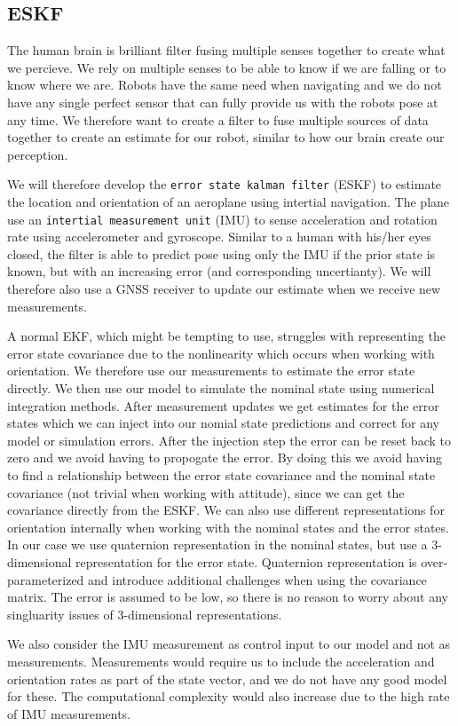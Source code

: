 \subsection{ESKF}
The human brain is brilliant filter fusing multiple senses together to create what we percieve. We rely on multiple senses to be able to know if we are falling or to know where we are. 
Robots have the same need when navigating and we do not have any single perfect sensor that can fully provide us with the robots pose at any time. We therefore want to create a filter to fuse multiple sources of data together to create an estimate for our robot, similar to how our brain create our perception.

We will therefore develop the \texttt{error state kalman filter} (ESKF) to estimate the location and orientation of an aeroplane using intertial navigation. The plane use an \texttt{intertial measurement unit} (IMU) to sense acceleration and rotation rate using accelerometer and gyroscope. Similar to a human with his/her eyes closed, the filter is able to predict pose using only the IMU if the prior state is known, but with an increasing error (and corresponding uncertianty). We will therefore also use a GNSS receiver to update our estimate when we receive new measurements. 

A normal EKF, which might be tempting to use, struggles with representing the error state covariance due to the nonlinearity which occurs when working with orientation. We therefore use our measurements to estimate the error state directly. We then use our model to simulate the nominal state using numerical integration methods. After measurement updates we get estimates for the error states which we can inject into our nomial state predictions and correct for any model or simulation errors. After the injection step the error can be reset back to zero and we avoid having to propogate the error. 
By doing this we avoid having to find a relationship between the error state covariance and the nominal state covariance (not trivial when working with attitude), since we can get the covariance directly from the ESKF. We can also use different representations for orientation internally when working with the nominal states and the error states. In our case we use quaternion representation in the nominal states, but use a 3-dimensional representation for the error state. Quaternion representation is over-parameterized and introduce additional challenges when using the covariance matrix. The error is assumed to be low, so there is no reason to worry about any singluarity issues of 3-dimensional representations. 

We also consider the IMU measurement as control input to our model and not as measurements. Measurements would require us to include the acceleration and orientation rates as part of the state vector, and we do not have any good model for these. The computational complexity would also increase due to the high rate of IMU measurements.